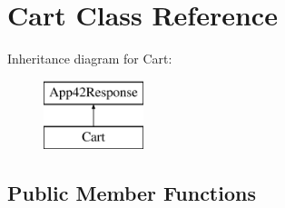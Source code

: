 \hypertarget{class_cart}{\section{Cart Class Reference}
\label{class_cart}
}
Inheritance diagram for Cart\+:\begin{figure}[H]
\begin{center}
\leavevmode
\includegraphics[height=2.000000cm]{class_cart}
\end{center}
\end{figure}
\subsection*{Public Member Functions}
